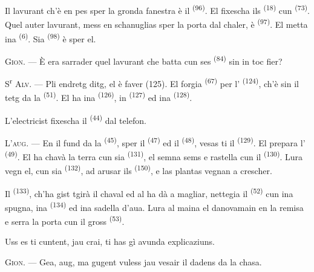 Il lavurant ch'è en pes sper la gronda fanestra è il 
\textsuperscript{(96)}. El fixescha ils  \textsuperscript{(18)} cun
 \textsuperscript{(73)}. Quel auter lavurant, mess en schanuglias sper
la porta dal chaler, è  \textsuperscript{(97)}. El metta ina
 \textsuperscript{(6)}. Sia  \textsuperscript{(98)} è
sper el.

\textsc{Gion}. --- È era sarrader quel lavurant che batta cun ses 
\textsuperscript{(84)} sin in toc fier?

S\textsuperscript{r} \textsc{Alv}. --- Pli endretg ditg, el è faver (125). El forgia
 \textsuperscript{(67)} per l'
\textsuperscript{(124)}, ch'è sin il tetg da la 
\textsuperscript{(51)}. El ha ina  \textsuperscript{(126)}, in
 \textsuperscript{(127)} ed ina 
\textsuperscript{(128)}.

L'electricist fixescha il   \textsuperscript{(44)} dal
telefon.

\VUsaut{3.0mm}

\textsc{L'aug}. --- En il fund da la  \textsuperscript{(45)}, sper il
 \textsuperscript{(47)} ed il  \textsuperscript{(48)},
vesas ti il  \textsuperscript{(129)}. El prepara l'
\textsuperscript{(49)}. El ha chavà la terra cun sia 
\textsuperscript{(131)}, el semna sems e rastella cun il 
\textsuperscript{(130)}. Lura vegn el, cun sia 
\textsuperscript{(132)}, ad arusar ils  \textsuperscript{(150)}, e las
plantas vegnan a crescher.

Il  \textsuperscript{(133)}, ch'ha gist tgirà il chaval
ed al ha dà a magliar, nettegia il  \textsuperscript{(52)} cun ina
spugna, ina  \textsuperscript{(134)} ed ina sadella d'aua. Lura
al maina el danovamain en la remisa e serra la porta cun il gross 
\textsuperscript{(53)}.

Uss es ti cuntent, jau crai, ti has gì avunda explicaziuns.

\textsc{Gion}. --- Gea, aug, ma gugent vuless jau vesair il dadens da la chasa.

